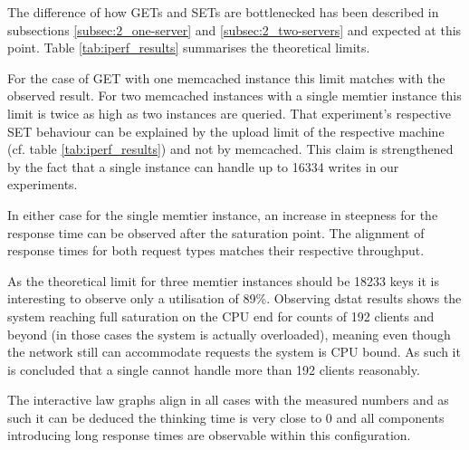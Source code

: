         The difference of how GETs and SETs are bottlenecked has been described in subsections \ref{subsec:2_one-server}
        and \ref{subsec:2_two-servers} and expected at this point. Table \ref{tab:iperf_results} summarises the
        theoretical limits.

        For the case of GET with one memcached instance this limit matches with the observed result. For two
        memcached instances with a single memtier instance this limit is twice as high as two instances are queried.
        That experiment's respective SET behaviour can be explained by the upload limit of the respective machine (cf.
        table \ref{tab:iperf_results}) and not by memcached. This claim is strengthened by the fact that a single
        instance can handle up to 16334 writes in our experiments.

        In either case for the single memtier instance, an increase in steepness for the response time can be
        observed after the saturation point. The alignment of response times for both request types matches their
        respective throughput.

        As the theoretical limit for three memtier instances should be 18233 keys it is interesting to observe only
        a utilisation of 89\%. Observing dstat results shows the system reaching full saturation on the CPU end for
        counts of 192 clients and beyond (in those cases the system is actually overloaded), meaning even though the
        network still can accommodate requests the system is CPU bound. As such it is concluded that a single \srv{}
        cannot handle more than 192 clients reasonably.

        The interactive law graphs align in all cases with the measured numbers and as such it can be deduced the
        thinking time is very close to 0 and all components introducing long response times are observable within this
        configuration.
